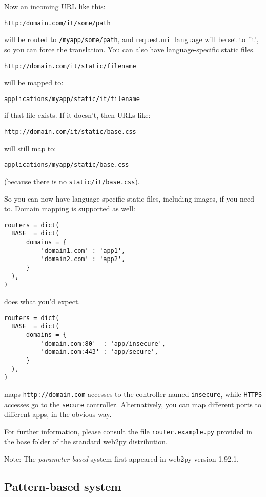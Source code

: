 \documentclass[justified,sixbynine,notoc]{tufte-book}
\def\ft{\small\tt}
\begin{document}
\begin{fullwidth}
Now an incoming URL like this:
\begin{lstlisting}[keywords={}]
http:/domain.com/it/some/path
\end{lstlisting}
will be routed to {\ft /myapp/some/path}, and request.uri\_language will be set to 'it', so you can force the translation. You can also have language-specific static files.

\begin{lstlisting}[keywords={}]
http://domain.com/it/static/filename
\end{lstlisting}
will be mapped to:
\begin{lstlisting}
applications/myapp/static/it/filename
\end{lstlisting}
if that file exists. If it doesn't, then URLs like:
\begin{lstlisting}[keywords={}]
http://domain.com/it/static/base.css
\end{lstlisting}
will still map to:
\begin{lstlisting}
applications/myapp/static/base.css
\end{lstlisting}
(because there is no {\ft static/it/base.css}).

So you can now have language-specific static files, including images, if you need to.  Domain mapping is supported as well:
\begin{lstlisting}
routers = dict(
  BASE  = dict(
      domains = {
          'domain1.com' : 'app1',
          'domain2.com' : 'app2',
      }
  ),
)
\end{lstlisting}
does what you'd expect.

\begin{lstlisting}
routers = dict(
  BASE  = dict(
      domains = {
          'domain.com:80'  : 'app/insecure',
          'domain.com:443' : 'app/secure',
      }
  ),
)
\end{lstlisting}
maps {\ft http://domain.com} accesses to the controller named {\ft insecure}, while {\ft HTTPS} accesses go to the {\ft secure} controller. Alternatively, you can map different ports to different apps, in the obvious way.

For further information, please consult the file {\footnotesize\href{http://code.google.com/p/web2py/source/browse/router.example.py}{{\ft router.example.py}}} provided in the base folder of the standard web2py distribution.

Note: The {\it parameter-based} system first appeared in web2py version 1.92.1.

\goodbreak\subsection{Pattern-based system}


\end{fullwidth}
\end{document}
